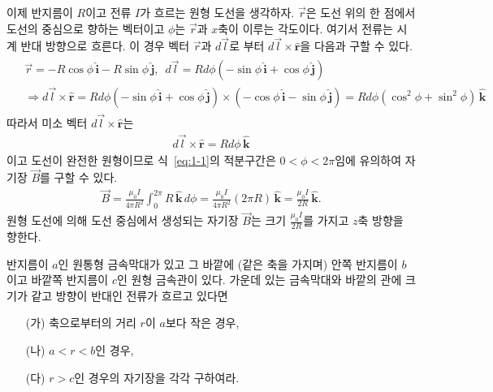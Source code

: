 \documentclass[tightenlines,floatfix,nofootinbib,superscriptaddress,fleqn]{revtex4}
\begin{document}
이제 반지름이 $R$이고 전류 $I$가 흐르는 원형 도선을 생각하자. $\vec{r}$은 도선 위의 한 
점에서 도선의 중심으로 향하는 벡터이고 $\phi$는 $\vec{r}$과 $x$축이 이루는 각도이다.
여기서 전류는 시계 반대 방향으로 흐른다.
이 경우 벡터 $\vec{r}$과 $d\vec{l}$로 부터 $d\vec{l}\times \hat{\bm r}$을
다음과 구할 수 있다.
\begin{align}
  \begin{split}
    &\vec{r} = -R\cos\phi\,\hat{\bm i}-R\sin\phi\,\hat{\bm j} ,\,\,\,
    d\vec{l} = Rd\phi(-\sin\phi\,\hat{\bm i}+\cos\phi\,\hat{\bm j}) \\
    &\Longrightarrow  
    d\vec{l}\times \hat{\bm r}=
    Rd\phi(-\sin\phi\,\hat{\bm i}+\cos\phi\,\hat{\bm j}) \times
    (-\cos\phi\,\hat{\bm i}-\sin\phi\,\hat{\bm j})
    =Rd\phi(\cos^2\phi+\sin^2\phi)\,\hat{\bm k}
  \end{split}
\end{align}
따라서 미소 벡터 $d\vec{l}\times \hat{\bm r}$는
\begin{align}
  d\vec{l}\times \hat{\bm r}=Rd\phi\,\hat{\bm k}
\end{align}
이고 도선이 완전한 원형이므로 식~\eqref{eq:1-1}의 적분구간은 $0<\phi<2\pi$임에 유의하여
자기장 $\vec{B}$를 구할 수 있다.
\begin{align}
  \vec{B} = \frac{\mu_0I}{4\pi R^2}\int_0^{2\pi}
  R\,\hat{\bm k}\,d\phi
  =\frac{\mu_0I}{4\pi R^2}(2\pi R)\,\hat{\bm k}
  =\frac{\mu_0I}{2 R}\,\hat{\bm k}.
\end{align}
원형 도선에 의해 도선 중심에서 생성되는 자기장 $\vec{B}$는 크기 $\frac{\mu_0I}{2 R}$를
가지고 $z$축 방향을 향한다.


\vspace{1cm}


반지름이 $a$인 원통형 금속막대가 있고 그 바깥에 (같은 축을 가지며)
안쪽 반지름이 $b$이고 바깥쪽 
반지름이 $c$인 원형 금속관이 있다. 가운데 있는 금속막대와 바깥의 관에
크기가 같고 방향이 반대인 전류가 흐르고 있다면 
\begin{itemize}
\item[(가)] 축으로부터의 거리 $r$이 $a$보다 작은 경우, 
\item[(나)] $a<r<b$인 경우, 
\item[(다)] $r>c$인 경우의 자기장을 각각 구하여라. 
\end{itemize}

\vspace{1cm}
\vspace{1cm}
\end{document}
